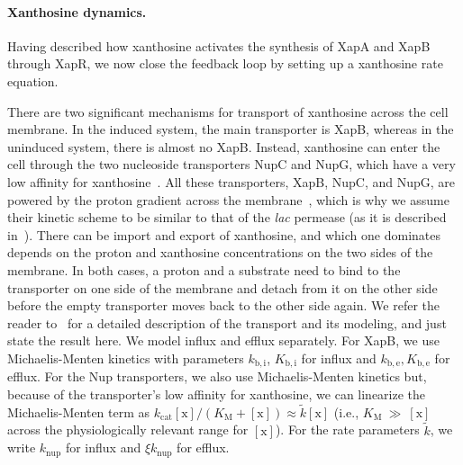 \documentclass[10pt,letterpaper]{article}
\newcommand{\n}[1]{\mathrm{#1}}
\begin{document}
	\paragraph*{Xanthosine dynamics.}
	Having described how xanthosine activates the synthesis of XapA and
	XapB through XapR, we now close the feedback loop
	by setting up a xanthosine rate equation.
	
	There are two significant mechanisms for transport of xanthosine across
	the cell membrane. In the induced system, the main transporter is XapB,
	whereas in the uninduced system, there is almost no XapB. Instead,
	xanthosine can enter the cell through the two nucleoside transporters
	NupC and NupG, which have a very low affinity for
	xanthosine~\cite{Norholm2001}. All these transporters, XapB, NupC, and
	NupG, are powered by the proton gradient across the
	membrane~\cite{Norholm2001}, which is why we assume their kinetic scheme
	to be similar to that of the \emph{lac} permease (as it is described
	in~\cite{Kaback2015}). There can be import and export of xanthosine, and
	which one dominates depends on the proton and xanthosine concentrations
	on the two sides of the membrane. In both cases, a proton and a
	substrate need to bind to the transporter on one side of the membrane
	and detach from it on the other side before the empty transporter moves
	back to the other side again. We refer the reader to~
	for a detailed description of the transport and its modeling, and just
	state the result here. We model influx and efflux separately. For XapB,
	we use Michaelis-Menten kinetics with parameters $k_{\n{b, i}}$,
	$K_{\n{b, i}}$ for influx and $k_{\n{b, e}}, K_{\n{b,e}}$ for efflux.
	For the Nup transporters, we also use Michaelis-Menten kinetics but,
	because of the transporter's low affinity for xanthosine,
	we can linearize the Michaelis-Menten term as
	$k_{\n{cat}} {\n{[x]}}/(K_{\n{M}} + \n{[x]}) \approx \tilde{k} \n{[x]}$
	(i.e., $K_{\n{M}}~\gg~\n{[x]}$ across the physiologically relevant range for $\n{[x]}$).
	For the rate parameters $\tilde{k}$, we write $k_{\n{nup}}$ for
	influx and $\xi k_{\n{nup}}$ for efflux. 
		
\end{document}
